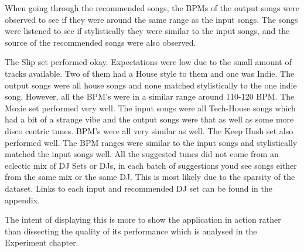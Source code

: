 When going through the recommended songs, the BPMs of the output songs were observed to see if they were around the same range as the input songs. The songs were listened to see if stylistically they were similar to the input songs, and the source of the recommended songs were also observed.

The Slip set performed okay. Expectations were low due to the small amount of tracks available. Two of them had a House style to them and one was Indie. The output songs were all house songs and none matched stylistically to the one indie song. However, all the BPM's were in a similar range around 110-120 BPM. The Moxie set performed very well. The input songs were all Tech-House songs which had a bit of a strange vibe and the output songs were that as well as some more disco centric tunes. BPM's were all very similar as well. The Keep Hush set also performed well. The BPM ranges were similar to the input songs and stylistically matched the input songs well. All the suggested tunes did not come from an eclectic mix of DJ Sets or DJs, in each batch of suggestions youd see songs either from the same mix or the same DJ. This is most likely due to the sparsity of the dataset. Links to each input and recommended DJ set can be found in the appendix.

The intent of displaying this is more to show the application in action rather than dissecting the quality of its performance which is analysed in the Experiment chapter.

